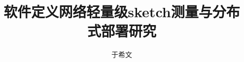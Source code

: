 \documentclass[master,professional]{ustcthesis}
\title{软件定义网络轻量级sketch测量与分布式部署研究}
\author{于希文}
\begin{document}
%

\maketitle
\makestatement

\frontmatter

\tableofcontents
% 

\mainmatter








\appendix

\backmatter


\end{document}
